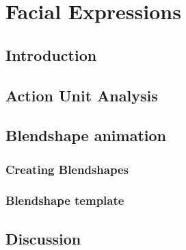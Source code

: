 \documentclass[../../main.tex]{subfiles}
\begin{document}
\chapter{Facial Expressions}

\section{Introduction}

\section{Action Unit Analysis}

\section{Blendshape animation}

\subsection{Creating Blendshapes}

\subsection{Blendshape template}

\section{Discussion}
\end{document}
